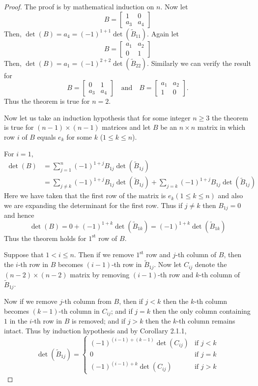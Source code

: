 \documentclass[12pt, a4paper]{article}
\theoremstyle{definition}
\theoremstyle{remark}
\begin{document}
    \begin{proof}
    The proof is by mathematical induction on $n$. Now let
    \[
    B = \begin{bmatrix}
    1 & 0 \\
    a_3 & a_4
    \end{bmatrix}
    \]
    Then, $\det(B) = a_4 = (-1)^{1+1} \det(\widetilde{B}_{11})$. Again let
    \[
    B = \begin{bmatrix}
    a_1 & a_2 \\
    0 & 1
    \end{bmatrix}
    \]
    Then, $\det(B) = a_1 = (-1)^{2+2} \det(\widetilde{B}_{22})$. Similarly we can verify the result for 
    \[
    B = \begin{bmatrix}
    0 & 1 \\
    a_3 & a_4
    \end{bmatrix} \quad \text{and} \quad
    B = \begin{bmatrix}
    a_1 & a_2 \\
    1 & 0
    \end{bmatrix}.
    \]
    Thus the theorem is true for $n=2$.

    Now let us take an induction hypothesis that for some integer $n \ge 3$ the theorem is true for $(n-1) \times (n-1)$ matrices and let $B$ be an $n \times n$ matrix in which row $i$ of $B$ equals $e_k$ for some $k$ ($1 \le k \le n$).

    For $i = 1$,
    \begin{align*}
    \det(B) &= \sum_{j=1}^{n} (-1)^{1+j} B_{1j} \det(\widetilde{B}_{1j}) \\
    &= \sum_{j \neq k}{(-1)^{1+j} B_{1j} \det(\widetilde{B}_{1j})} + \sum_{j=k} (-1)^{1+j} B_{1j} \det(\widetilde{B}_{1j})
    \end{align*}
    Here we have taken that the first row of the matrix is $e_k(1\le k \le n)$ and also we are expanding the determinant for the first row. Thus if $j \ne k$ then $B_{1j} = 0$ and hence 
    \[
    \det(B) = 0 + (-1)^{1+k}\det(\widetilde{B}_{1k}) = (-1)^{1+k}\det(\widetilde{B}_{1k})
    \]
    Thus the theorem holds for $1^{\text{st}}$ row of $B$.

    Suppose that $1 < i \le n$. Then if we remove $1^{\text{st}}$ row and $j$-th column of $B$, then the $i$-th row in $B$ becomes $(i-1)$-th row in $\widetilde{B}_{1j}$. Now let $C_{ij}$ denote the $(n-2) \times (n-2)$ matrix by removing $(i-1)$-th row and $k$-th column of $\widetilde{B}_{1j}$.

    Now if we remove $j$-th column from $B$, then if $j < k$ then the $k$-th column becomes $(k-1)$-th column in $C_{ij}$; and if $j = k$ then the only column containing $1$ in the $i$-th row in $B$ is removed; and if $j > k$ then the $k$-th column remains intact. Thus by induction hypothesis and by Corollary 2.1.1,
    \[
    \det(\widetilde{B}_{1j}) = \begin{cases}
    (-1)^{(i-1)+(k-1)} \det(C_{ij}) & \text{if } j < k \\
    0 & \text{if } j = k \\
    (-1)^{(i-1)+k} \det(C_{ij}) & \text{if } j > k
    \end{cases}
    \]


\end{proof}
\end{document}
